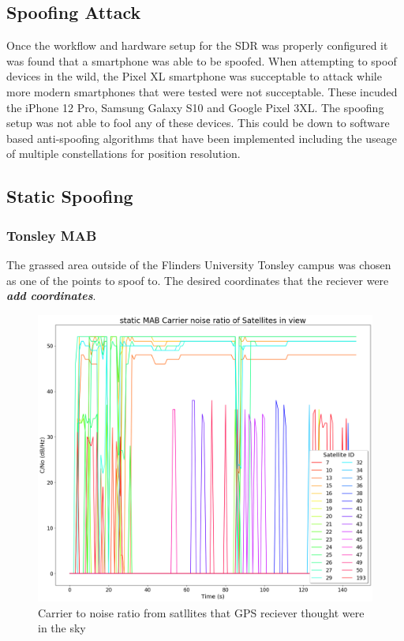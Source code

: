 \subsection{Spoofing Attack}
Once the workflow and hardware setup for the SDR was properly configured it was found that a smartphone was able to be spoofed.
When attempting to spoof devices in the wild, the Pixel XL smartphone was succeptable to attack while more modern smartphones that were tested were not succeptable. These
incuded the iPhone 12 Pro, Samsung Galaxy S10 and Google Pixel 3XL. The spoofing setup was not able to fool any of these devices. This could be down to software based
anti-spoofing algorithms that have been implemented including the useage of multiple constellations for position resolution.

\subsection{Static Spoofing}
\subsubsection{Tonsley MAB}
The grassed area outside of the Flinders University Tonsley campus was chosen as one of the points to spoof to. The desired coordinates that the reciever were
\emph{\textbf{add coordinates}}. 

\begin{figure}[h]
    \begin{centering}
        \includegraphics[width=14cm,keepaspectratio]{Figures/2021_3_30_static_MAB Carrier noise ratio.png}
        \caption{Carrier to noise ratio from satllites that GPS reciever thought were in the sky}
        \label{fig:MABStaticCNo}
    \end{centering}
\end{figure}


